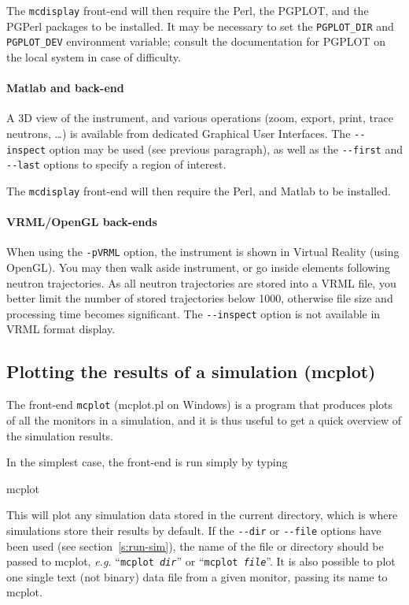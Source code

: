 The \verb+mcdisplay+ front-end will then require the Perl,
the PGPLOT, and the PGPerl packages to be installed. It may be necessary to set
the \verb+PGPLOT_DIR+ and \verb+PGPLOT_DEV+ environment variable; consult the
documentation for PGPLOT on the local system in case of difficulty.

\paragraph{Matlab and back-end}

A 3D view of the instrument, and various operations (zoom, export, print, trace
neutrons, \ldots) is available from dedicated Graphical User Interfaces.  The
\verb+--inspect+ option may be used (see previous paragraph), as well as the
\verb+--first+ and \verb+--last+ options to specify a region of interest.

The \verb+mcdisplay+ front-end will then require the Perl, and
Matlab to be installed. 

\paragraph{VRML/OpenGL back-ends}

When using the \verb+-pVRML+ option, the instrument is shown in Virtual Reality
(using OpenGL). You may then walk aside instrument, or go inside elements
following neutron trajectories. As all neutron trajectories are stored into a
VRML file, you better limit the number of stored trajectories below 1000,
otherwise file size and processing time becomes significant. The
\verb+--inspect+ option is not available in VRML format display.

\subsection{Plotting the results of a simulation (mcplot)}
\label{s:mcplot}

The front-end \verb+mcplot+ (mcplot.pl on Windows) is a program that produces
plots of all the monitors in a simulation, and it is thus useful to get
a quick overview of the simulation results.

In the simplest case, the front-end is run simply by typing
\begin{bash}
    mcplot
\end{bash}
This will plot any simulation data stored in the current directory, which is
where simulations store their results by default. If the \verb+--dir+ or
\verb+--file+ options have been used (see section~\ref{s:run-sim}), the name of
the file or directory should be passed to mcplot, {\em e.g.} ``\texttt{mcplot
  \textit{dir}}'' or ``\texttt{mcplot \textit{file}}''.  It is also possible to plot
one single text (not binary) data file from a given monitor, passing its name to
mcplot.

